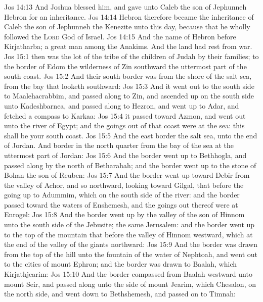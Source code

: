 \vs Jos 14:13 And Joshua blessed him, and gave unto Caleb the son of Jephunneh Hebron for an inheritance.
\vs Jos 14:14 Hebron therefore became the inheritance of Caleb the son of Jephunneh the Kenezite unto this day, because that he wholly followed the \textsc{Lord} God of Israel.
\vs Jos 14:15 And the name of Hebron before  Kirjatharba;  a great man among the Anakims. And the land had rest from war.
\vs Jos 15:1  then was the lot of the tribe of the children of Judah by their families;  to the border of Edom the wilderness of Zin southward  the uttermost part of the south coast.
\vs Jos 15:2 And their south border was from the shore of the salt sea, from the bay that looketh southward:
\vs Jos 15:3 And it went out to the south side to Maalehacrabbim, and passed along to Zin, and ascended up on the south side unto Kadeshbarnea, and passed along to Hezron, and went up to Adar, and fetched a compass to Karkaa:
\vs Jos 15:4  it passed toward Azmon, and went out unto the river of Egypt; and the goings out of that coast were at the sea: this shall be your south coast.
\vs Jos 15:5 And the east border  the salt sea,  unto the end of Jordan. And  border in the north quarter  from the bay of the sea at the uttermost part of Jordan:
\vs Jos 15:6 And the border went up to Bethhogla, and passed along by the north of Betharabah; and the border went up to the stone of Bohan the son of Reuben:
\vs Jos 15:7 And the border went up toward Debir from the valley of Achor, and so northward, looking toward Gilgal, that  before the going up to Adummim, which  on the south side of the river: and the border passed toward the waters of Enshemesh, and the goings out thereof were at Enrogel:
\vs Jos 15:8 And the border went up by the valley of the son of Hinnom unto the south side of the Jebusite; the same  Jerusalem: and the border went up to the top of the mountain that  before the valley of Hinnom westward, which  at the end of the valley of the giants northward:
\vs Jos 15:9 And the border was drawn from the top of the hill unto the fountain of the water of Nephtoah, and went out to the cities of mount Ephron; and the border was drawn to Baalah, which  Kirjathjearim:
\vs Jos 15:10 And the border compassed from Baalah westward unto mount Seir, and passed along unto the side of mount Jearim, which  Chesalon, on the north side, and went down to Bethshemesh, and passed on to Timnah:
